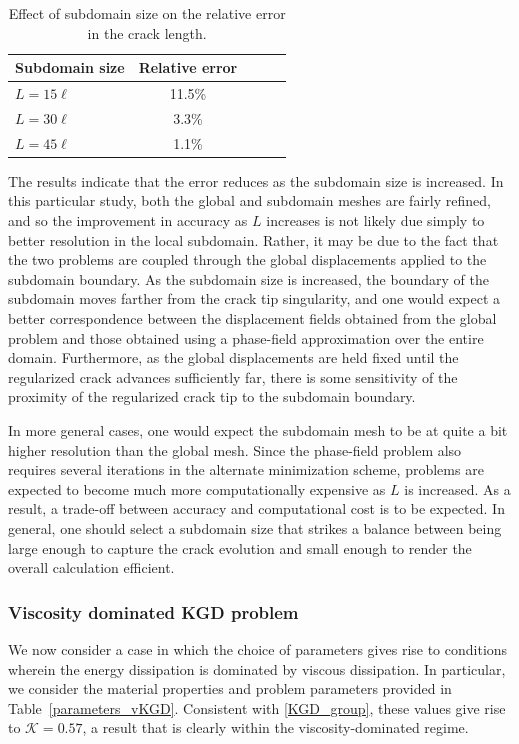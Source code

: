 \begin{table}[ht]
\centering
\caption{Effect of subdomain size on the relative error in the crack length. }
\begin{tabular}[t]{lcccc}
\hline
Subdomain size &Relative error   \\
\hline
$L = 15\ell$&11.5\%&\\
$L = 30\ell$&3.3\%&\\
$L = 45\ell$&1.1\%&\\

\hline
\end{tabular}
\label{subdomain_size_table}
\end{table}%

The results indicate that the error reduces as the subdomain size is increased.  In this particular study, both the global and subdomain meshes are fairly refined, and so the improvement in accuracy as $L$ increases is not likely due simply to better resolution in the local subdomain.  Rather, it may be due to the fact that the two problems are coupled through the global displacements applied to the subdomain boundary.  As the subdomain size is increased, the boundary of the subdomain moves farther from the crack tip singularity, and one would expect a better correspondence between the displacement fields obtained from the global problem and those obtained using a phase-field approximation over the entire domain.  Furthermore, as the global displacements are held fixed until the regularized crack advances sufficiently far, there is some sensitivity of the proximity of the regularized crack tip to the subdomain boundary.  

In more general cases, one would expect the subdomain mesh to be at quite a bit higher resolution than the global mesh. Since the phase-field problem also requires several iterations in the alternate minimization scheme, problems are expected to become much more computationally expensive as $L$ is increased. As a result, a trade-off between accuracy and computational cost is to be expected.  In general, one should select  a subdomain size that strikes a balance between being large enough to capture the crack evolution and small enough to render the overall calculation efficient. 

\subsubsection{Viscosity dominated KGD problem}

We now consider a case in which the choice of parameters gives rise to conditions wherein the energy dissipation is dominated by viscous dissipation.  In particular, we consider the material properties and problem parameters provided in Table~\ref{parameters_vKGD}.  Consistent with \eqref{KGD_group}, these values give rise to $\mathcal{K} = 0.57$, a result that is clearly within the viscosity-dominated regime.   

